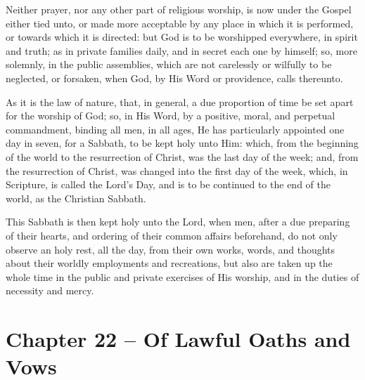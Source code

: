 \begin{outerlst}[left=0pt,labelsep=0pt]
\begin{innerlst}[resume*]
\item Neither prayer, nor any other part of religious worship, is now under the Gospel either tied unto, or made more acceptable by any place in which it is performed, or towards which it is directed: but God is to be worshipped everywhere, in spirit and truth; as in private families daily, and in secret each one by himself; so, more solemnly, in the public assemblies, which are not carelessly or wilfully to be neglected, or forsaken, when God, by His Word or providence, calls thereunto.   

\item As it is the law of nature, that, in general, a due proportion of time be set apart for the worship of God; so, in His Word, by a positive, moral, and perpetual commandment, binding all men, in all ages, He has particularly appointed one day in seven, for a Sabbath, to be kept holy unto Him: which, from the beginning of the world to the resurrection of Christ, was the last day of the week; and, from the resurrection of Christ, was changed into the first day of the week, which, in Scripture, is called the Lord's Day, and is to be continued to the end of the world, as the Christian Sabbath.   

\item This Sabbath is then kept holy unto the Lord, when men, after a due preparing of their hearts, and ordering of their common affairs beforehand, do not only observe an holy rest, all the day, from their own works, words, and thoughts about their worldly employments and recreations, but also are taken up the whole time in the public and private exercises of His worship, and in the duties of necessity and mercy.  
\end{innerlst}

\item
{}
\section{Chapter 22 -- Of Lawful Oaths and Vows}
\begin{innerlst}[resume*]


\end{innerlst}
\end{outerlst}
